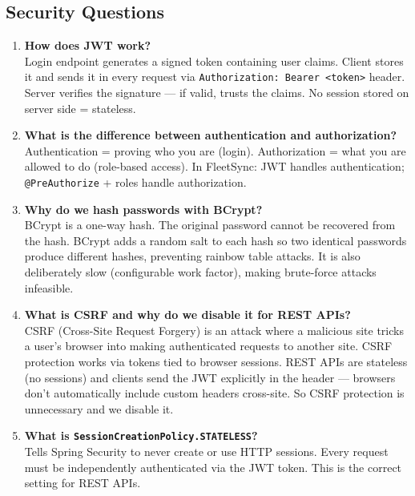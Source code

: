 \documentclass[12pt,a4paper]{report}
\newcommand{\code}[1]{\texttt{\textcolor{keywordblue}{#1}}}
\begin{document}
\subsection{Security Questions}

\begin{enumerate}[resume]
  \item \textbf{How does JWT work?}\\
  Login endpoint generates a signed token containing user claims. Client stores it and sends it in every request via \code{Authorization: Bearer <token>} header. Server verifies the signature --- if valid, trusts the claims. No session stored on server side = stateless.

  \item \textbf{What is the difference between authentication and authorization?}\\
  Authentication = proving who you are (login). Authorization = what you are allowed to do (role-based access). In FleetSync: JWT handles authentication; \code{@PreAuthorize} + roles handle authorization.

  \item \textbf{Why do we hash passwords with BCrypt?}\\
  BCrypt is a one-way hash. The original password cannot be recovered from the hash. BCrypt adds a random salt to each hash so two identical passwords produce different hashes, preventing rainbow table attacks. It is also deliberately slow (configurable work factor), making brute-force attacks infeasible.

  \item \textbf{What is CSRF and why do we disable it for REST APIs?}\\
  CSRF (Cross-Site Request Forgery) is an attack where a malicious site tricks a user's browser into making authenticated requests to another site. CSRF protection works via tokens tied to browser sessions. REST APIs are stateless (no sessions) and clients send the JWT explicitly in the header --- browsers don't automatically include custom headers cross-site. So CSRF protection is unnecessary and we disable it.

  \item \textbf{What is \code{SessionCreationPolicy.STATELESS}?}\\
  Tells Spring Security to never create or use HTTP sessions. Every request must be independently authenticated via the JWT token. This is the correct setting for REST APIs.
\end{enumerate}
\end{document}
